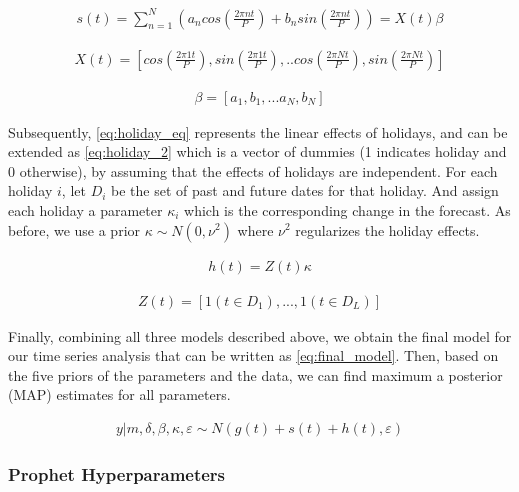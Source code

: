 \begin{align}\label{eq:seasonal_eq}
s(t) = \sum_{n=1}^N \left( a_n cos\left(\frac{2\pi nt}{P}\right) + b_n sin\left( \frac{2\pi nt}{P}  \right)  \right) = X(t)\beta
\end{align}

\begin{align}\label{eq:seasonal_ext}
X(t) = \left[ cos\left(\frac{2\pi1t}{P} \right), sin\left(\frac{2\pi1t}{P}\right),..cos\left(\frac{2\pi Nt}{P} \right), sin\left(\frac{2\pi Nt}{P}\right)  \right]
\end{align}

\begin{align}\label{eq:seasonal_beta}
\beta = [a_1,b_1,...a_N,b_N]
\end{align}

Subsequently, \autoref{eq:holiday_eq} represents the linear effects of holidays, and can be extended as \autoref{eq:holiday_2} which is a vector of dummies (1 indicates holiday and 0 otherwise), by assuming that the effects of holidays are independent. For each holiday $i$, let $D_i$ be the set of past and future dates for that holiday. And assign each holiday a parameter $\kappa_i$ which is the corresponding change in the forecast. As before, we use a prior $\kappa \sim N(0,\nu^2)$ where $\nu^2$ regularizes the holiday effects.

\begin{align}\label{eq:holiday_eq}
h(t)= Z(t)\kappa
\end{align}

\begin{align}\label{eq:holiday_2}
Z(t) = [1(t \in  D_1) ,..., 1(t \in  D_L)] 
\end{align}

Finally, combining all three models described above, we obtain the final model for our time series analysis that can be written as \autoref{eq:final_model}. Then, based on the five priors of the parameters and the data, we can find maximum a posterior (MAP) estimates for all parameters.

\begin{align}\label{eq:final_model}
y|m,\delta,\beta,\kappa,\varepsilon \sim N(g(t) + s(t) + h(t), \varepsilon)
\end{align}


\subsubsection[Prophet Hyperparameters]{Prophet Hyperparameters}
\label{sec:hyperparameters}

